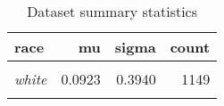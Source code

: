 \begin{table}[!h]

\caption{\label{tab:dataset_summary}Dataset summary statistics}
\centering
\begin{tabular}[t]{>{}lrrr}
\toprule
race & mu & sigma & count\\
\midrule
\em{\cellcolor{gray!6}{black}} & \cellcolor{gray!6}{0.5220} & \cellcolor{gray!6}{1.0723} & \cellcolor{gray!6}{159}\\
\em{white} & 0.0923 & 0.3940 & 1149\\
\em{\cellcolor{gray!6}{total}} & \cellcolor{gray!6}{0.1445} & \cellcolor{gray!6}{0.5432} & \cellcolor{gray!6}{1308}\\
\bottomrule
\end{tabular}
\end{table}
